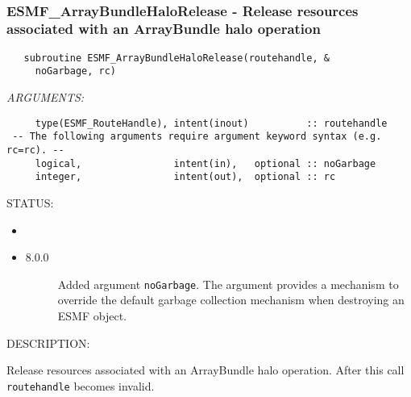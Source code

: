  
\mbox{}\hrulefill\ 
 
\subsubsection [ESMF\_ArrayBundleHaloRelease] {ESMF\_ArrayBundleHaloRelease - Release resources associated with an ArrayBundle halo operation}


  
\begin{verbatim}   subroutine ESMF_ArrayBundleHaloRelease(routehandle, &
     noGarbage, rc)\end{verbatim}{\em ARGUMENTS:}
\begin{verbatim}     type(ESMF_RouteHandle), intent(inout)          :: routehandle
 -- The following arguments require argument keyword syntax (e.g. rc=rc). --
     logical,                intent(in),   optional :: noGarbage
     integer,                intent(out),  optional :: rc\end{verbatim}
{\sf STATUS:}
   \begin{itemize}
   \item{}
   \item{}
   \begin{description}
   \item[8.0.0] Added argument {\tt noGarbage}.
     The argument provides a mechanism to override the default garbage collection
     mechanism when destroying an ESMF object.
   \end{description}
   \end{itemize}
  
{\sf DESCRIPTION:\\ }


     Release resources associated with an ArrayBundle halo operation.
     After this call {\tt routehandle} becomes invalid.
  
